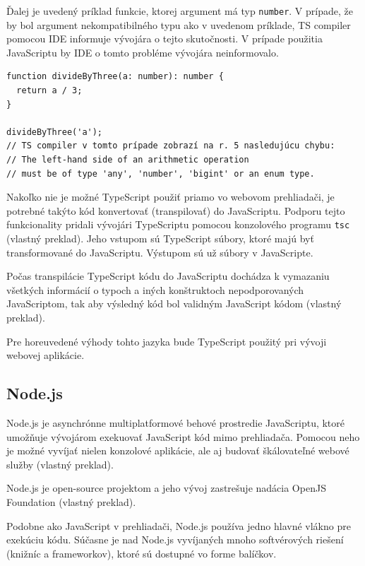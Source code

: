 Ďalej je uvedený príklad funkcie, ktorej argument má typ \texttt{number}. V prípade, že by bol argument nekompatibilného typu ako v uvedenom príklade, TS compiler pomocou IDE informuje vývojára o tejto skutočnosti. V prípade použitia JavaScriptu by IDE o tomto probléme vývojára neinformovalo.

\begin{minipage}[]{\linewidth}
\begin{verbatim}
function divideByThree(a: number): number {
  return a / 3;
}

divideByThree('a');
// TS compiler v tomto prípade zobrazí na r. 5 nasledujúcu chybu:
// The left-hand side of an arithmetic operation
// must be of type 'any', 'number', 'bigint' or an enum type.
\end{verbatim}
\end{minipage}

Nakoľko nie je možné TypeScript použiť priamo vo webovom prehliadači, je potrebné takýto kód konvertovať (transpilovať) do JavaScriptu. Podporu tejto funkcionality pridali vývojári TypeScriptu pomocou konzolového programu \texttt{tsc} \cite{about_typescript} (vlastný preklad). Jeho vstupom sú TypeScript súbory, ktoré majú byť transformované do JavaScriptu. Výstupom sú už súbory v JavaScripte.

Počas transpilácie TypeScript kódu do JavaScriptu dochádza k vymazaniu všetkých informácií o typoch a iných konštruktoch nepodporovaných JavaScriptom, tak aby výsledný kód bol validným JavaScript kódom \cite{about_typescript} (vlastný preklad).

Pre horeuvedené výhody tohto jazyka bude TypeScript použitý pri vývoji webovej aplikácie.

\subsection {Node.js}
Node.js je asynchrónne multiplatformové behové prostredie JavaScriptu, ktoré umožňuje vývojárom exekuovať JavaScript kód mimo prehliadača. Pomocou neho je možné vyvíjať nielen konzolové aplikácie, ale aj budovať škálovateľné webové služby \cite{about_nodejs} (vlastný preklad).

Node.js je open-source projektom a jeho vývoj zastrešuje nadácia OpenJS Foundation \cite{about_nodejs} (vlastný preklad).

Podobne ako JavaScript v prehliadači, Node.js používa jedno hlavné vlákno pre exekúciu kódu. Súčasne je nad Node.js vyvíjaných mnoho softvérových riešení (knižníc a frameworkov), ktoré sú dostupné vo forme balíčkov.

